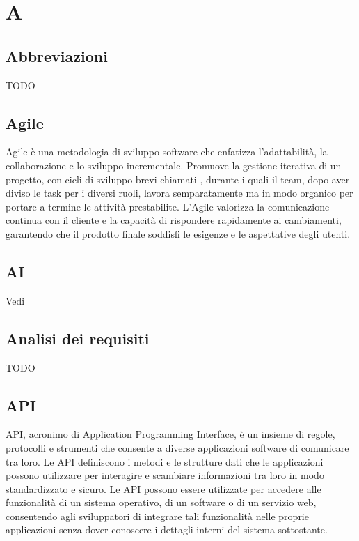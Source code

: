 \section{A}

\vspace{2em}
\subsection*{Abbreviazioni}
TODO

\vspace{2em}
\subsection*{Agile}
Agile è una metodologia di sviluppo software che enfatizza l'adattabilità, la collaborazione e lo sviluppo incrementale. Promuove la gestione iterativa di un progetto, con cicli di sviluppo brevi chiamati , durante i quali il team, dopo aver diviso le task per i diversi ruoli, lavora semparatamente ma in modo organico per portare a termine le attività prestabilite. L'Agile valorizza la comunicazione continua con il cliente e la capacità di rispondere rapidamente ai cambiamenti, garantendo che il prodotto finale soddisfi le esigenze e le aspettative degli utenti.

\vspace{2em}
\subsection*{AI}
\par Vedi 

\vspace{2em}
\subsection*{Analisi dei requisiti}
TODO

\vspace{2em}
\subsection*{API}
API, acronimo di Application Programming Interface, è un insieme di regole, protocolli e strumenti che consente a diverse applicazioni software di comunicare tra loro. Le API definiscono i metodi e le strutture dati che le applicazioni possono utilizzare per interagire e scambiare informazioni tra loro in modo standardizzato e sicuro. Le API possono essere utilizzate per accedere alle funzionalità di un sistema operativo, di un software o di un servizio web, consentendo agli sviluppatori di integrare tali funzionalità nelle proprie applicazioni senza dover conoscere i dettagli interni del sistema sottostante.

